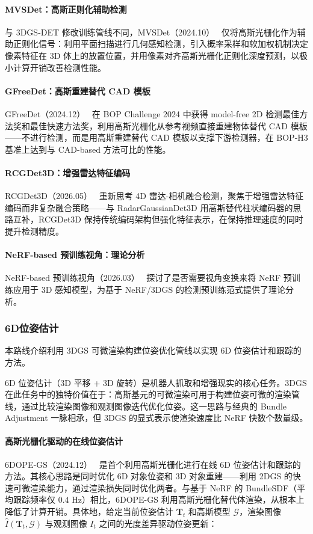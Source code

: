 \paragraph{MVSDet：高斯正则化辅助检测} 与 3DGS-DET 修改训练管线不同，MVSDet（2024.10）~\cite{2410_21566} 仅将高斯光栅化作为辅助正则化信号：利用平面扫描进行几何感知检测，引入概率采样和软加权机制决定像素特征在 3D 体上的放置位置，并用像素对齐高斯光栅化正则化深度预测，以极小计算开销改善检测性能。

\paragraph{GFreeDet：高斯重建替代 CAD 模板} GFreeDet（2024.12）~\cite{2412_01552} 在 BOP Challenge 2024 中获得 model-free 2D 检测最佳方法奖和最佳快速方法奖，利用高斯光栅化从参考视频直接重建物体替代 CAD 模板——不进行检测，而是用高斯重建替代 CAD 模板以支撑下游检测器，在 BOP-H3 基准上达到与 CAD-based 方法可比的性能。

\paragraph{RCGDet3D：增强雷达特征编码} RCGDet3D（2026.05）~\cite{2605_21112} 重新思考 4D 雷达-相机融合检测，聚焦于增强雷达特征编码而非复杂融合策略——与 RadarGaussianDet3D 用高斯替代柱状编码器的思路互补，RCGDet3D 保持传统编码架构但强化特征表示，在保持推理速度的同时提升检测精度。

\paragraph{NeRF-based 预训练视角：理论分析} NeRF-based 预训练视角（2026.03）~\cite{2603_28090} 探讨了是否需要视角变换来将 NeRF 预训练应用于 3D 感知模型，为基于 NeRF/3DGS 的检测预训练范式提供了理论分析。

\subsubsection{6D位姿估计}

本路线介绍利用 3DGS 可微渲染构建位姿优化管线以实现 6D 位姿估计和跟踪的方法。

6D 位姿估计（3D 平移 + 3D 旋转）是机器人抓取和增强现实的核心任务。3DGS 在此任务中的独特价值在于：高斯基元的可微渲染可用于构建位姿可微的渲染管线，通过比较渲染图像和观测图像迭代优化位姿。这一思路与经典的 Bundle Adjustment 一脉相承，但 3DGS 的显式表示使渲染速度比 NeRF 快数个数量级。

\paragraph{高斯光栅化驱动的在线位姿估计} 6DOPE-GS（2024.12）~\cite{2412_01543} 是首个利用高斯光栅化进行在线 6D 位姿估计和跟踪的方法。其核心思路是同时优化 6D 对象位姿和 3D 对象重建——利用 2DGS 的快速可微渲染能力，通过渲染损失同时优化两者。与基于 NeRF 的 BundleSDF（平均跟踪频率仅 $0.4$ Hz）相比，6DOPE-GS 利用高斯光栅化替代体渲染，从根本上降低了计算开销。具体地，给定当前位姿估计 $\mathbf{T}_t$ 和高斯模型 $\mathcal{G}$，渲染图像 $\hat{I}(\mathbf{T}_t, \mathcal{G})$ 与观测图像 $I_t$ 之间的光度差异驱动位姿更新：

